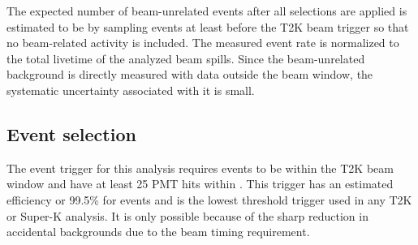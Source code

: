 \documentclass[
aps,
prd,
twocolumn,
superscriptaddress,
showpacs
]{revtex4-1}
\begin{document}
The expected number of beam-unrelated events after all selections are applied is estimated to be \bkgdnon by sampling events at least  before the T2K beam trigger so that no beam-related activity is included. The measured event rate is normalized to the total livetime of the analyzed beam spills. Since the beam-unrelated background is directly measured with data outside the beam window, the systematic uncertainty associated with it is small.

\begin{table}[b]
\caption{Observed and expected numbers of events in T2K Runs 1-3. The CC samples are based on the flux at SK including three-flavor oscillations (parameters described in the text). The NC samples are based on the unoscillated flux. The $\nue$ NCQE events are treated as signal, but the $\numubar$ NCQE are considered background since there is a different predicted cross-section for antineutrinos.} 
\begin{center}
\end{center}
\end{table}



\subsection{Event selection}

The event trigger for this analysis requires events to be within the  T2K beam window and have at least 25 PMT hits within .  This trigger has an estimated efficiency or 99.5\% for  events and is the lowest threshold trigger used in any T2K or Super-K analysis.  It is only possible because of the sharp reduction in accidental backgrounds due to the beam timing requirement. 
\end{document}
